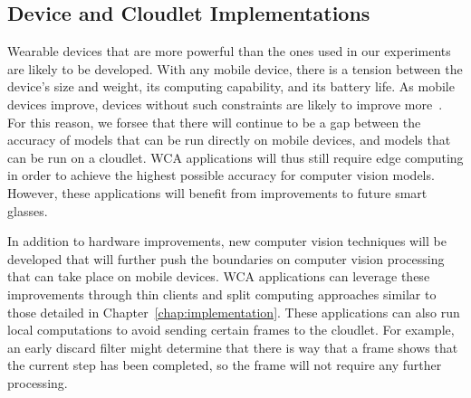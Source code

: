 \subsection{Device and Cloudlet Implementations}

Wearable devices that are more powerful than the ones used in our experiments
are likely to be developed.
With any mobile device, there is a tension between the device's size and
weight, its computing capability, and its battery life.
As mobile devices improve, devices without such constraints are likely to
improve more~\cite{Satya2021}.
For this reason, we forsee that there will continue to be a gap between the
accuracy of models that can be run directly on mobile devices, and models that
can be run on a cloudlet.
WCA applications will thus still require edge computing in order to achieve the
highest possible accuracy for computer vision models.
However, these applications will benefit from improvements to future smart
glasses.

In addition to hardware improvements, new computer vision techniques will be
developed that will further push the boundaries on computer vision processing
that can take place on mobile devices.
WCA applications can leverage these improvements through thin clients and split
computing approaches similar to those detailed in
Chapter~\ref{chap:implementation}.
These applications can also run local computations to avoid sending certain
frames to the cloudlet.
For example, an early discard filter might determine that there is way that a
frame shows that the current step has been completed, so the frame will not
require any further processing.

